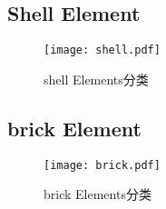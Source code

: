 \documentclass[lang=cn]{elegantpaper}
\begin{document}
\subsection{ Shell Element}
\begin{figure}[H]		
	\centering
	\texttt{[image: shell.pdf]}
	\caption{shell Elements分类}
	\label{tu12}
\end{figure}
\subsection{brick Element}
\begin{figure}[H]		
	\centering
	\texttt{[image: brick.pdf]}
	\caption{brick Elements分类}
	\label{tu12}
\end{figure}
\end{document}
